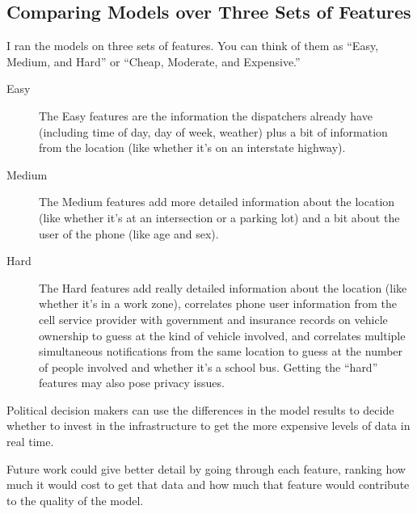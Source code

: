 \subsection{Comparing Models over Three Sets of Features}

I ran the models on three sets of features.  You can think of them as ``Easy, Medium, and Hard'' or ``Cheap, Moderate, and Expensive.''  

\begin{description}
	\item [Easy] The Easy features are the information the dispatchers already have (including time of day, day of week, weather) plus a bit of information from the location (like whether it's on an interstate highway).  
	\item [Medium]	The Medium features add more detailed information about the location (like whether it's at an intersection or a parking lot) and a bit about the user of the phone (like age and sex).  
	\item [Hard] The Hard features add really detailed information about the location (like whether it's in a work zone), correlates phone user information from the cell service provider with government and insurance records on vehicle ownership to guess at the kind of vehicle involved, and correlates multiple simultaneous notifications from the same location to guess at the number of people involved and whether it's a school bus.  Getting the ``hard'' features may also pose privacy issues.  
\end{description}

Political decision makers can use the differences in the model results to decide whether to invest in the infrastructure to get the more expensive levels of data in real time.  

Future work could give better detail by going through each feature, ranking how much it would cost to get that data and how much that feature would contribute to the quality of the model.  

\


